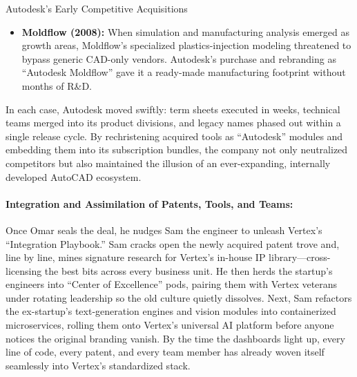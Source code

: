 \begin{HistoricalSidebar}{Autodesk’s Early Competitive Acquisitions}
\begin{itemize}
    \medskip

    \item \textbf{Moldflow (2008):}  When simulation and manufacturing analysis emerged as growth areas, Moldflow’s 
    specialized plastics-injection modeling threatened to bypass generic CAD-only vendors.  Autodesk’s purchase and 
    rebranding as “Autodesk Moldflow” gave it a ready-made manufacturing footprint without months of R\&D.
  \end{itemize}

  \medskip
  
  In each case, Autodesk moved swiftly: term sheets executed in weeks, technical teams merged into its product 
  divisions, and legacy names phased out within a single release cycle.  By rechristening acquired tools as “Autodesk” 
  modules and embedding them into its subscription bundles, the company not only neutralized competitors but also 
  maintained the illusion of an ever-expanding, internally developed AutoCAD ecosystem.

\end{HistoricalSidebar}

\medskip


\paragraph{Integration and Assimilation of Patents, Tools, and Teams:}
Once Omar seals the deal, he nudges Sam the engineer to unleash Vertex’s “Integration Playbook.” Sam cracks open the 
newly acquired patent trove and, line by line, mines signature research for Vertex’s in-house IP library—cross-licensing 
the best bits across every business unit. He then herds the startup’s engineers into “Center of Excellence” pods, 
pairing them with Vertex veterans under rotating leadership so the old culture quietly dissolves. Next, Sam refactors 
the ex-startup’s text-generation engines and vision modules into containerized microservices, rolling them onto Vertex’s 
universal AI platform before anyone notices the original branding vanish. By the time the dashboards light up, every 
line of code, every patent, and every team member has already woven itself seamlessly into Vertex’s standardized stack.


\medskip

